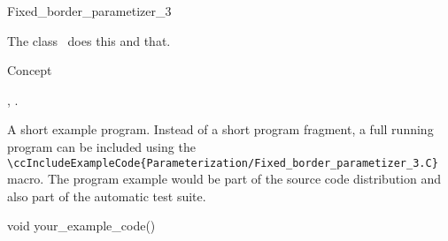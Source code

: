 

\begin{ccRefClass}{Fixed_border_parametizer_3}  %


\ccDefinition
  
The class \ccRefName\ does this and that.


\ccIsModel

Concept

\ccTypes


\ccCreation
{}  %


\ccOperations


\ccSeeAlso

,
.

\ccExample

A short example program.
Instead of a short program fragment, a full running program can be
included using the 
\verb|\ccIncludeExampleCode{Parameterization/Fixed_border_parametizer_3.C}| 
macro. The program example would be part of the source code distribution and
also part of the automatic test suite.

\begin{ccExampleCode}
void your_example_code() {
}
\end{ccExampleCode}


\end{ccRefClass}


